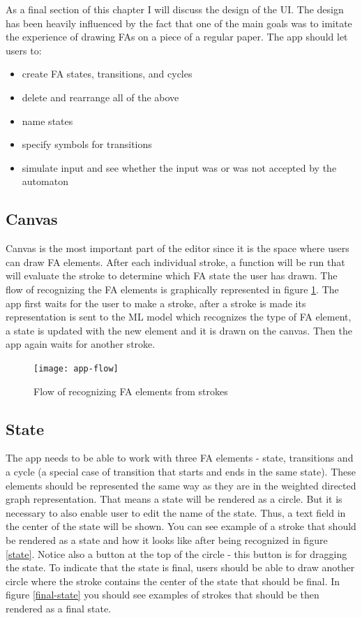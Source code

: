 As a final section of this chapter I will discuss the design of the UI. The design has been heavily influenced by the fact that one of the main goals was to imitate the experience of drawing FAs on a piece of a regular paper. The app should let users to:
\begin{itemize}
    \item create FA states, transitions, and cycles
    \item delete and rearrange all of the above
    \item name states
    \item specify symbols for transitions
    \item simulate input and see whether the input was or was not accepted by the automaton
\end{itemize}

\subsection{Canvas}

Canvas is the most important part of the editor since it is the space where users can draw FA elements. After each individual stroke, a function will be run that will evaluate the stroke to determine which FA state the user has drawn. The flow of recognizing the FA elements is graphically represented in figure \ref{app-flow}. The app first waits for the user to make a stroke, after a stroke is made its representation is sent to the ML model which recognizes the type of FA element, a state is updated with the new element and it is drawn on the canvas. Then the app again waits for another stroke.

\begin{figure}
    \texttt{[image: app-flow]}
    \caption{Flow of recognizing FA elements from strokes}\label{app-flow}
\end{figure}

\subsection{State}

The app needs to be able to work with three FA elements - state, transitions and a cycle (a special case of transition that starts and ends in the same state). These elements should be represented the same way as they are in the weighted directed graph representation. That means a state will be rendered as a circle. But it is necessary to also enable user to edit the name of the state. Thus, a text field in the center of the state will be shown. You can see example of a stroke that should be rendered as a state and how it looks like after being recognized in figure \ref{state}. Notice also a button at the top of the circle - this button is for dragging the state. To indicate that the state is final, users should be able to draw another circle where the stroke contains the center of the state that should be final. In figure \ref{final-state} you should see examples of strokes that should be then rendered as a final state.

